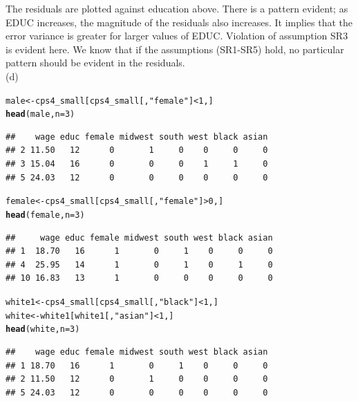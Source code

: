 \documentclass[a4paper]{article}\usepackage[]{graphicx}\usepackage[]{color}
\makeatletter
\newcommand{\hlnum}[1]{\textcolor[rgb]{0.686,0.059,0.569}{#1}}%
\newcommand{\hlstr}[1]{\textcolor[rgb]{0.192,0.494,0.8}{#1}}%
\newcommand{\hlopt}[1]{\textcolor[rgb]{0,0,0}{#1}}%
\newcommand{\hlstd}[1]{\textcolor[rgb]{0.345,0.345,0.345}{#1}}%
\newcommand{\hlkwb}[1]{\textcolor[rgb]{0.69,0.353,0.396}{#1}}%
\newcommand{\hlkwc}[1]{\textcolor[rgb]{0.333,0.667,0.333}{#1}}%
\newcommand{\hlkwd}[1]{\textcolor[rgb]{0.737,0.353,0.396}{\textbf{#1}}}%
\newenvironment{kframe}{%
 \def\at@end@of@kframe{}%
 \ifinner\ifhmode%
  \def\at@end@of@kframe{\end{minipage}}%
  \begin{minipage}{\columnwidth}%
 \fi\fi%
 \def\FrameCommand##1{\hskip\@totalleftmargin \hskip-\fboxsep
 \colorbox{shadecolor}{##1}\hskip-\fboxsep
     \hskip-\linewidth \hskip-\@totalleftmargin \hskip\columnwidth}%
 \MakeFramed {\advance\hsize-\width
   \@totalleftmargin\z@ \linewidth\hsize
   \@setminipage}}%
 {\par\unskip\endMakeFramed%
 \at@end@of@kframe}
\newenvironment{knitrout}{}{} %
\makeatother
\begin{document}
The residuals are plotted against education above. There is a pattern evident; as EDUC increases, the magnitude of the residuals also increases. It implies that the error
variance is greater for larger values of EDUC. Violation of assumption SR3 is evident here. We know that if the assumptions (SR1-SR5) hold, no particular pattern should be evident in the residuals.\\


(d)
\begin{knitrout}
\color{fgcolor}\begin{kframe}
\begin{alltt}
\hlstd{male} \hlkwb{<-} \hlstd{cps4_small[cps4_small[,} \hlstr{"female"}\hlstd{]}\hlopt{<}\hlnum{1}\hlstd{, ]}
\hlkwd{head}\hlstd{(male,}\hlkwc{n}\hlstd{=}\hlnum{3}\hlstd{)}
\end{alltt}
\begin{verbatim}
##    wage educ female midwest south west black asian
## 2 11.50   12      0       1     0    0     0     0
## 3 15.04   16      0       0     0    1     1     0
## 5 24.03   12      0       0     0    0     0     0
\end{verbatim}
\begin{alltt}
\hlstd{female} \hlkwb{<-} \hlstd{cps4_small[cps4_small[,} \hlstr{"female"}\hlstd{]}\hlopt{>}\hlnum{0}\hlstd{, ]}
\hlkwd{head}\hlstd{(female,}\hlkwc{n}\hlstd{=}\hlnum{3}\hlstd{)}
\end{alltt}
\begin{verbatim}
##     wage educ female midwest south west black asian
## 1  18.70   16      1       0     1    0     0     0
## 4  25.95   14      1       0     1    0     1     0
## 10 16.83   13      1       0     0    0     0     0
\end{verbatim}
\begin{alltt}
\hlstd{white1} \hlkwb{<-} \hlstd{cps4_small[cps4_small[,} \hlstr{"black"}\hlstd{]}\hlopt{<}\hlnum{1}\hlstd{, ]}
\hlstd{white} \hlkwb{<-} \hlstd{white1[white1[,} \hlstr{"asian"}\hlstd{]}\hlopt{<}\hlnum{1}\hlstd{, ]}
\hlkwd{head}\hlstd{(white,}\hlkwc{n}\hlstd{=}\hlnum{3}\hlstd{)}
\end{alltt}
\begin{verbatim}
##    wage educ female midwest south west black asian
## 1 18.70   16      1       0     1    0     0     0
## 2 11.50   12      0       1     0    0     0     0
## 5 24.03   12      0       0     0    0     0     0
\end{verbatim}
\begin{alltt}

\end{alltt}
\end{kframe}
\end{knitrout}
\end{document}
